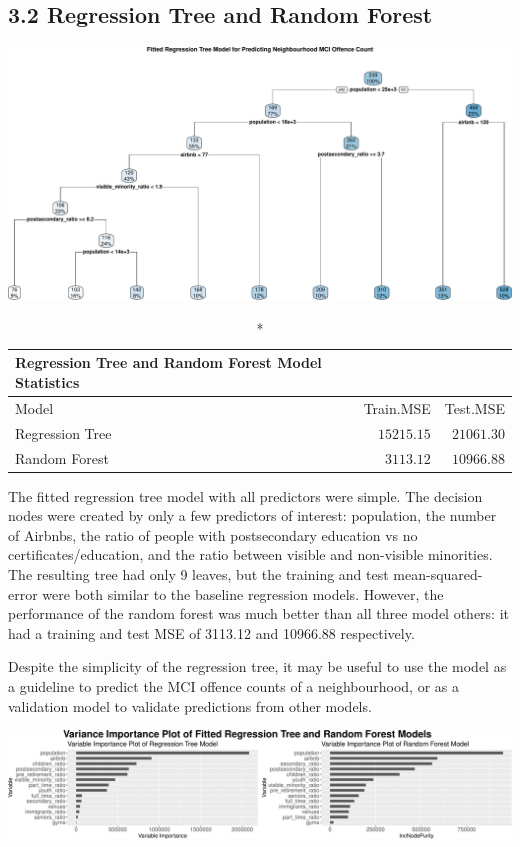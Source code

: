 \documentclass[
]{article}
\begin{document}
\hypertarget{regression-tree-and-random-forest}{%
\subsection{3.2 Regression Tree and Random
Forest}\label{regression-tree-and-random-forest}}

\includegraphics{Final-Report_files/figure-latex/reg-tree-1.pdf}

\begin{longtable}{lrr}
\caption*{
{\large Regression Tree and Random Forest Model Statistics}
} \\ 
\toprule
Model & Train.MSE & Test.MSE \\ 
\midrule
Regression Tree & $15215.15$ & $21061.30$ \\ 
Random Forest & $3113.12$ & $10966.88$ \\ 
\bottomrule
\end{longtable}

The fitted regression tree model with all predictors were simple. The
decision nodes were created by only a few predictors of interest:
population, the number of Airbnbs, the ratio of people with
postsecondary education vs no certificates/education, and the ratio
between visible and non-visible minorities. The resulting tree had only
9 leaves, but the training and test mean-squared-error were both similar
to the baseline regression models. However, the performance of the
random forest was much better than all three model others: it had a
training and test MSE of 3113.12 and 10966.88 respectively.

Despite the simplicity of the regression tree, it may be useful to use
the model as a guideline to predict the MCI offence counts of a
neighbourhood, or as a validation model to validate predictions from
other models.

\includegraphics{Final-Report_files/figure-latex/vip-plots-1.pdf}
\end{document}
